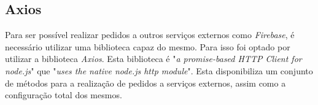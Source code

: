\subsection{Axios}

Para ser possível realizar pedidos a outros serviços externos como \textit{Firebase}, é necessário utilizar uma biblioteca capaz do mesmo. Para isso foi optado por utilizar a biblioteca \textit{Axios}. Esta biblioteca é "\emph{a promise-based HTTP Client for node.js}"\citep{axios} que "\emph{uses the native node.js http module}"\citep{axios}. Esta disponibiliza um conjunto de métodos para a realização de pedidos a serviços externos, assim como a configuração total dos mesmos.